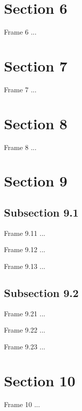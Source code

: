 \documentclass{beamer}
\begin{document}
\section{Section 6}
\begin{frame}{Frame 6}
...
\end{frame}

\section{Section 7}
\begin{frame}{Frame 7}
...
\end{frame}

\section{Section 8}
\begin{frame}{Frame 8}
...
\end{frame}

\section{Section 9}
\subsection{Subsection 9.1}
\begin{frame}{Frame 9.11}
...
\end{frame}
\begin{frame}{Frame 9.12}
...
\end{frame}
\begin{frame}{Frame 9.13}
...
\end{frame}
\subsection{Subsection 9.2}
\begin{frame}{Frame 9.21}
...
\end{frame}
\begin{frame}{Frame 9.22}
...
\end{frame}
\begin{frame}{Frame 9.23}
...
\end{frame}


\section{Section 10}
\begin{frame}{Frame 10}
...
\end{frame}
\end{document}
